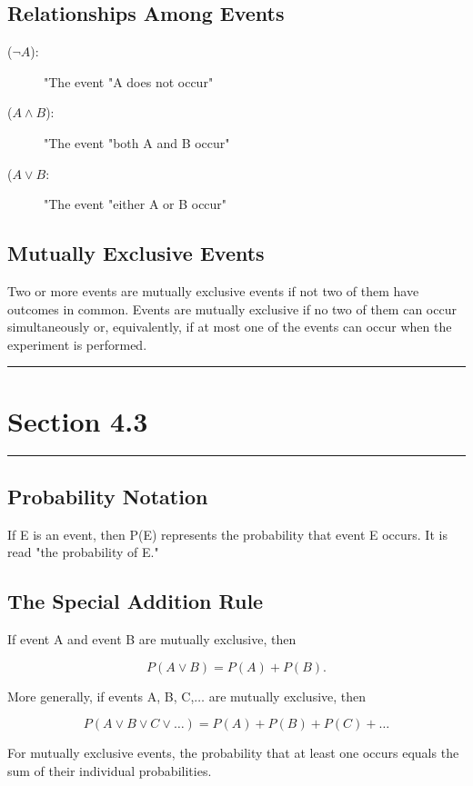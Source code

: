 \documentclass[12pt]{article}
\begin{document}
        \subsection*{Relationships Among Events}
            \begin{description}
                \item[(\(\neg A\)):] "The event "A does not occur"
                \item[(\(A \wedge B\)):] "The event "both A and B occur"
                \item[(\(A \vee B\):] "The event "either A or B occur"
            \end{description}
        \subsection*{Mutually Exclusive Events}
               Two or more events are mutually exclusive events if not two of them have outcomes in
               common.
               Events are mutually exclusive if no two of them can occur simultaneously or,
               equivalently, if at most one of the events can occur when the experiment is performed.

    \noindent\rule{\textwidth}{0.4pt}
    \section*{Section 4.3}
    \noindent\rule{\textwidth}{0.4pt}
        \subsection*{Probability Notation}
            If E is an event, then P(E) represents the probability that event E occurs. It is read
            "the probability of E."
        \subsection*{The Special Addition Rule}
            If event A and event B are mutually exclusive, then
            \begin{center}
                \[
                    P(A \vee B) = P(A)  + P(B).  
                \]
            \end{center}
            More generally, if events A, B, C,$\dots$ are mutually exclusive, then
            \begin{center}
                \[
                    P(A \vee B \vee C \vee \dots) = P(A) + P(B) + P(C) + \dots    
                \]                
            \end{center}
            For mutually exclusive events, the probability that at least one occurs equals the sum
            of their individual probabilities.
\end{document}
